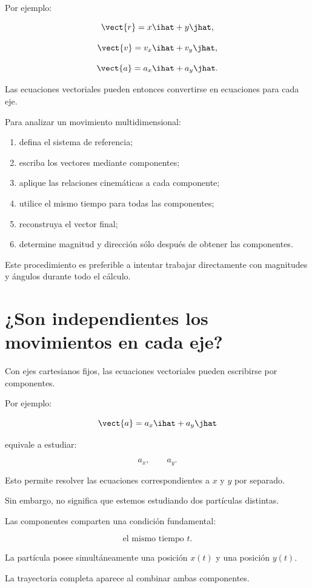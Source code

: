 Por ejemplo:

\[
\vect{r}
=
x\ihat+y\jhat,
\]

\[
\vect{v}
=
v_x\ihat+v_y\jhat,
\]

\[
\vect{a}
=
a_x\ihat+a_y\jhat.
\]

Las ecuaciones vectoriales pueden entonces convertirse en ecuaciones para cada
eje.

\begin{estrategia}
Para analizar un movimiento multidimensional:

\begin{enumerate}
    \item defina el sistema de referencia;
    \item escriba los vectores mediante componentes;
    \item aplique las relaciones cinemáticas a cada componente;
    \item utilice el mismo tiempo para todas las componentes;
    \item reconstruya el vector final;
    \item determine magnitud y dirección sólo después de obtener las componentes.
\end{enumerate}
\end{estrategia}

Este procedimiento es preferible a intentar trabajar directamente con
magnitudes y ángulos durante todo el cálculo.


\section{¿Son independientes los movimientos en cada eje?}

Con ejes cartesianos fijos, las ecuaciones vectoriales pueden escribirse por
componentes.

Por ejemplo:

\[
\vect{a}
=
a_x\ihat+a_y\jhat
\]

equivale a estudiar:

\[
a_x,
\qquad
a_y.
\]

Esto permite resolver las ecuaciones correspondientes a \(x\) y \(y\) por
separado.

Sin embargo, no significa que estemos estudiando dos partículas distintas.

\begin{interpretacion}
Las componentes comparten una condición fundamental:

\[
\boxed{\text{el mismo tiempo }t}.
\]

La partícula posee simultáneamente una posición \(x(t)\) y una posición \(y(t)\).

La trayectoria completa aparece al combinar ambas componentes.
\end{interpretacion}

